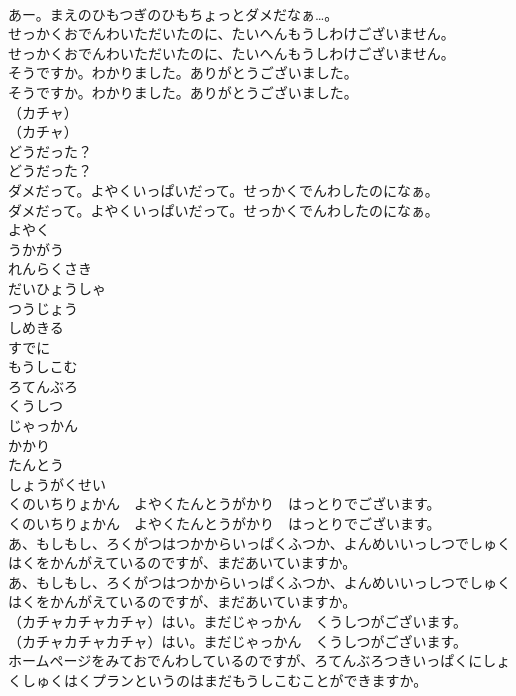 \documentclass[8pt]{extreport}
\begin{document}
\begin{CJK}{UTF8}{min}
\\	あー。まえのひもつぎのひもちょっとダメだなぁ…。 
\\	せっかくおでんわいただいたのに、たいへんもうしわけございません。	
\\	せっかくおでんわいただいたのに、たいへんもうしわけございません。 
\\	そうですか。わかりました。ありがとうございました。	
\\	そうですか。わかりました。ありがとうございました。 
\\	（カチャ）	
\\	（カチャ） 
\\	どうだった？	
\\	どうだった？ 
\\	ダメだって。よやくいっぱいだって。せっかくでんわしたのになぁ。	
\\	ダメだって。よやくいっぱいだって。せっかくでんわしたのになぁ。 
\\	よやく
\\	うかがう
\\	れんらくさき
\\	だいひょうしゃ
\\	つうじょう
\\	しめきる
\\	すでに
\\	もうしこむ
\\	ろてんぶろ
\\	くうしつ
\\	じゃっかん
\\	かかり
\\	たんとう
\\	しょうがくせい
\\	くのいちりょかん　よやくたんとうがかり　はっとりでございます。	
\\	くのいちりょかん　よやくたんとうがかり　はっとりでございます。 
\\	あ、もしもし、ろくがつはつかからいっぱくふつか、よんめいいっしつでしゅくはくをかんがえているのですが、まだあいていますか。	
\\	あ、もしもし、ろくがつはつかからいっぱくふつか、よんめいいっしつでしゅくはくをかんがえているのですが、まだあいていますか。 
\\	（カチャカチャカチャ）はい。まだじゃっかん　くうしつがございます。	
\\	（カチャカチャカチャ）はい。まだじゃっかん　くうしつがございます。 
\\	ホームページをみておでんわしているのですが、ろてんぶろつきいっぱくにしょくしゅくはくプランというのはまだもうしこむことができますか。	

\end{CJK}
\end{document}
